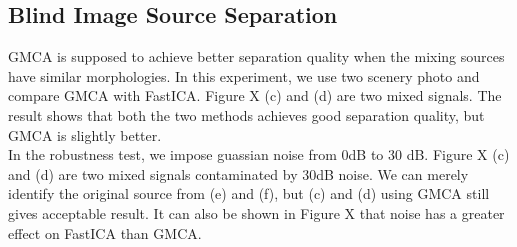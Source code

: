\subsection{Blind Image Source Separation}

GMCA is supposed to achieve better separation quality when the mixing sources have similar morphologies. In this experiment, we use two scenery photo and compare GMCA with FastICA. Figure X (c) and (d) are two mixed signals. The result shows that both the two methods achieves good separation quality, but GMCA is slightly better. \\
In the robustness test, we impose guassian noise from 0dB to 30 dB. Figure X (c) and (d) are two mixed signals contaminated by 30dB noise. We can merely identify the original source from (e) and (f), but (c) and (d) using GMCA still gives acceptable result. It can also be shown in Figure X that noise has a greater effect on FastICA than GMCA. 


